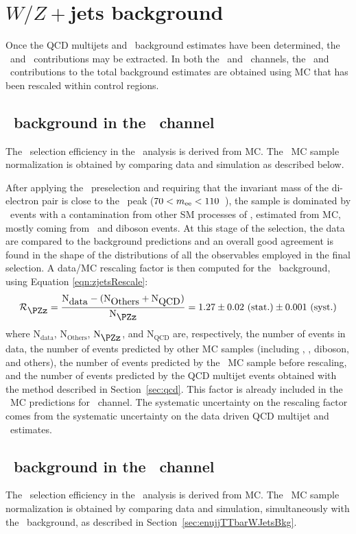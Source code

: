 \section{$W/Z+$jets background}
\label{sec:vjets}

Once the QCD multijets and \ttbar~background estimates have been determined,
the \zjets~and \wjets~contributions may be extracted.
In both the \eejj~and \enujj~channels, the \zjets~and \wjets~contributions
to the total background estimates are obtained using MC that has
been rescaled within control regions.
  
\subsection{\zjets~background in the \eejj~channel} 
\label{sec:eejjZjetsBkg}

The \zjets~selection efficiency in the \eejj~analysis is derived from MC.
The \zjets~MC sample normalization is obtained by comparing 
data and simulation as described below.

After applying the \eejj~preselection and requiring that the invariant mass 
of the di-electron pair is close to the \PZz~peak 
($70<\mbox{\ensuremath{m_{\text{ee}}}}<110$~\GeV), the sample is dominated by \zjets~events 
with a contamination from other SM processes of \ContaminationAtZpeak, estimated from MC, 
mostly coming from \ttbar~and diboson events.
At this stage of the selection, the data are compared to the background predictions
and an overall good agreement is found in the shape of the 
distributions of all the observables employed in the final selection.
A data/MC rescaling factor is then computed for the \zjets~background, using Equation \ref{eqn:zjetsRescale}:
\begin{equation}
  \mathcal{R}_{\mbox{\PZz}} = \frac{\mbox{N}_{\mbox{data}} - ( \mbox{N}_{\mbox{Others}} + \mbox{N}_{\mbox{QCD}} )}{\mbox{N}_{\mbox{\PZz}}} = \mbox{\rescaleFactorZSherpa}
  \label{eqn:zjetsRescale}
\end{equation}
where $\mbox{N}_{\mbox{data}} $, $\mbox{N}_{\mbox{Others}}$, $\mbox{N}_{\mbox{\PZz}}$, 
and $\mbox{N}_{\mbox{QCD}}$ are, respectively, the number of events in data, the 
number of events predicted by other MC samples (including \ttbar, \wjets, 
diboson, and others), the number of events predicted by the \zjets~MC sample before rescaling, 
and the number of events predicted by the QCD multijet events obtained with the method described in Section~\ref{sec:qcd}.
This factor is already included in the \zjets~MC predictions for \eejj~channel.
The systematic uncertainty on the rescaling factor comes from the systematic uncertainty on the 
data driven QCD multijet and \ttbar~estimates.

\subsection{\wjets~background in the \enujj~channel} 
\label{sec:enujjWjetsBkg}

The \wjets~selection efficiency in the \enujj~analysis is derived from MC.
The \wjets~MC sample normalization is obtained by comparing 
data and simulation, simultaneously with the \ttbar~background, 
as described in Section~\ref{sec:enujjTTbarWJetsBkg}.

